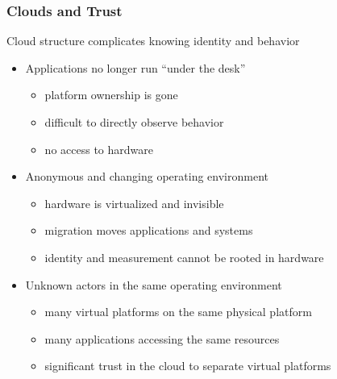 \documentclass{beamer}
\begin{document}
\begin{frame}
  \frametitle{Clouds and Trust}

  Cloud structure complicates knowing identity and behavior

  \begin{itemize}
  \item Applications no longer run ``under the desk''
    \begin{itemize}
    \item platform ownership is gone
    \item difficult to directly observe behavior
    \item no access to hardware
    \end{itemize}
  \item Anonymous and changing operating environment
    \begin{itemize}
    \item hardware is virtualized and invisible
    \item migration moves applications and systems
    \item identity and measurement cannot be rooted in hardware
    \end{itemize}
  \item Unknown actors in the same operating environment
    \begin{itemize}
    \item many virtual platforms on the same physical platform
    \item many applications accessing the same resources
    \item significant trust in the cloud to separate virtual platforms
    \end{itemize}
  \end{itemize}
\end{frame}
\end{document}
